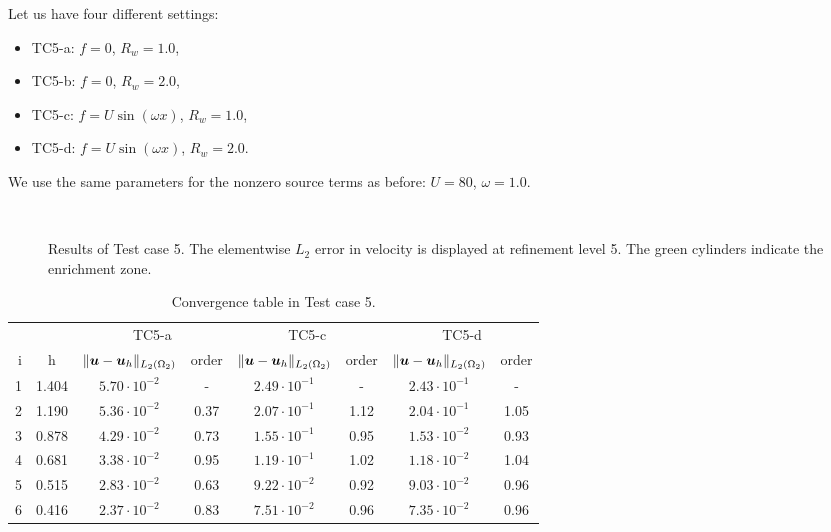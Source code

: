 Let us have four different settings: 
\begin{itemize}
    \item TC5-a: $f=0$, $R_w=1.0$,
    \item TC5-b: $f=0$, $R_w=2.0$,
    \item TC5-c: $f=U\sin(\omega x)$, $R_w=1.0$,
    \item TC5-d: $f=U\sin(\omega x)$, $R_w=2.0$.
\end{itemize}
We use the same parameters for the nonzero source terms as before: $U=80$, $\omega=1.0$.
%
\begin{figure}[!htb]
    \centering
     \\
    \caption[Error distribution in Test case 5.]
    {Results of Test case 5. The elementwise $L_2$ error in velocity is displayed at refinement level 5.
    The green cylinders indicate the enrichment zone. }
    \label{fig:mh_tc5_error}
\end{figure}
%
\begin{table}[!htb]
\begin{center}
\bgroup
\def\arraystretch{1.2}
\setlength\tabcolsep{5pt}
\begin{tabular}{rc|cc|cc|cc}
\toprule
\multicolumn{2}{c|}{} & \multicolumn{2}{c|}{ TC5-a } & \multicolumn{2}{c|}{ TC5-c } & \multicolumn{2}{c}{TC5-d}\\ [3pt] %
i & h & $\|\mathbf{\boldsymbol{u}}-\mathbf{\boldsymbol{u}}_h\|_{L_2(\Omega_2)}$ & order & $\|\mathbf{\boldsymbol{u}}-\mathbf{\boldsymbol{u}}_h\|_{L_2(\Omega_2)}$
    & order & $\|\mathbf{\boldsymbol{u}}-\mathbf{\boldsymbol{u}}_h\|_{L_2(\Omega_2)}$ & order \\ [3pt] \midrule
1 & 1.404 & $5.70\cdot10^{-2}$  &  -   & $2.49\cdot10^{-1}$  &  -   & $2.43\cdot10^{-1}$ &   -   \\
2 & 1.190 & $5.36\cdot10^{-2}$  & 0.37 & $2.07\cdot10^{-1}$  & 1.12 & $2.04\cdot10^{-1}$ &  1.05 \\
3 & 0.878 & $4.29\cdot10^{-2}$  & 0.73 & $1.55\cdot10^{-1}$  & 0.95 & $1.53\cdot10^{-2}$ &  0.93 \\
4 & 0.681 & $3.38\cdot10^{-2}$  & 0.95 & $1.19\cdot10^{-1}$  & 1.02 & $1.18\cdot10^{-2}$ &  1.04 \\
5 & 0.515 & $2.83\cdot10^{-2}$  & 0.63 & $9.22\cdot10^{-2}$  & 0.92 & $9.03\cdot10^{-2}$ &  0.96 \\
6 & 0.416 & $2.37\cdot10^{-2}$  & 0.83 & $7.51\cdot10^{-2}$  & 0.96 & $7.35\cdot10^{-2}$ &  0.96 \\
\bottomrule
\end{tabular}
\caption{Convergence table in Test case 5.}
\label{tab:mh_tc5_convergence}
\egroup
\end{center}
\end{table}

